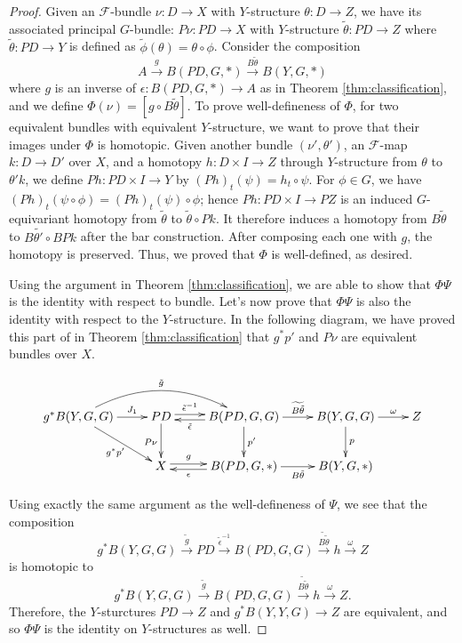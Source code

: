 \documentclass[psamsfonts]{amsart}
\theoremstyle{definition}
\theoremstyle{remark}
\numberwithin{equation}{section}
\begin{document}
\begin{proof}
Given an  $\mathcal{F}$-bundle $\nu: D \rightarrow X$ with $Y$-structure $\theta: D \to Z$, we have its associated principal $G$-bundle: $P\nu: PD \rightarrow X$ with $Y$-structure $\tilde{\theta}: PD \to Z$ where $\tilde{\theta}: PD \to Y$ is defined as $\tilde{\phi}(\theta) = \theta \circ \phi$. Consider the composition $$A \xrightarrow{g} B(PD, G, *) \xrightarrow{B\tilde{\theta}} B(Y, G, *)$$ where $g$ is an inverse of $\epsilon: B(PD, G, *) \to A$ as in Theorem \ref{thm:classification}, and we define $\Phi(\nu) = [g \circ B\tilde{\theta}]$. To prove well-defineness of $\Phi$, for two equivalent bundles with equivalent $Y$-structure, we want to prove that their images under $\Phi$ is homotopic. Given another bundle $(\nu', \theta')$, an $\mathcal{F}$-map $k: D \to D'$ over $X$, and a homotopy $h: D \times I \to Z$ through $Y$-structure from $\theta$ to $\theta' k$, we define $Ph: PD \times I \to Y$ by $(Ph)_{t}(\psi) = h_{t} \circ \psi$. For $\phi \in G$, we have $(Ph)_{t}(\psi \circ \phi) = (Ph)_{t}(\psi)\circ \phi$; hence $Ph: PD \times I \to PZ$ is an induced $G$-equivariant homotopy from $\tilde{\theta}$ to $\tilde{\theta} \circ Pk$. It therefore induces a homotopy from $B\tilde{\theta}$ to $B\tilde{\theta'} \circ BPk$ after the bar construction. After composing each one with $g$, the homotopy is preserved. Thus, we proved that $\Phi$ is well-defined, as desired.

Using the argument in Theorem \ref{thm:classification}, we are able to show that $\Phi\Psi$ is the identity with respect to bundle. Let's now prove that $\Phi\Psi$ is also the identity with respect to the $Y$-structure. In the following diagram, we have proved this part of in Theorem \ref{thm:classification} that $g^{*}p'$ and $P\nu$ are equivalent bundles over $X$. 

\[\xymatrix{
g^{*}B(Y, G, G) \ar[dr]_-{g^{*}p'} \ar[r]^-{J_{1}} \ar@/^5ex/[rr]^-{\tilde{g}} & PD \ar[d]_{P\nu} \ar[r]<0.5ex>^-{\tilde{\epsilon}^{-1}} & B(PD, G, G) \ar[d]^{p'} \ar[l]<0.5ex>^-{\tilde{\epsilon}} \ar[r]^-{\widetilde{B\tilde{\theta}}}& B(Y, G, G) \ar[d]^-{p} \ar[r]^-{\omega} & Z\\
& X \ar[r]<0.5ex>^-{g} & B(PD, G, *) \ar[l]<0.5ex>^-{\epsilon} \ar[r]_-{B\tilde{\theta}} & B(Y, G, *) \\} \]

Using exactly the same argument as the well-defineness of $\Psi$, we see that the composition $$g^{*}B(Y, G, G) \xrightarrow{\tilde{g}} PD \xrightarrow{\tilde{\epsilon}^{-1}}  B(PD, G, G) \xrightarrow{\widetilde{B\tilde{\theta}}} h \xrightarrow{\omega} Z $$ is homotopic to $$g^{*}B(Y, G, G) \xrightarrow{\tilde{g}}  B(PD, G, G) \xrightarrow{\widetilde{B\tilde{\theta}}} h \xrightarrow{\omega} Z.$$ Therefore, the $Y$-sturctures $PD \to Z$ and $g^{*}{B(Y, Y, G)} \to Z$ are equivalent, and so $\Phi\Psi$ is the identity on $Y$-structures as well.








\end{proof}
\end{document}
